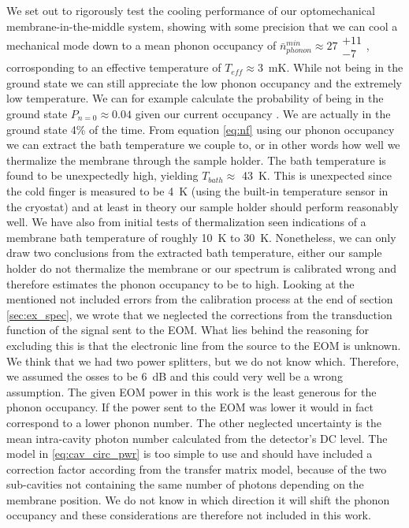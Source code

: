 We set out to rigorously test the cooling performance of our optomechanical membrane-in-the-middle system, showing with some precision that we can cool a mechanical mode down to a mean phonon occupancy of $\bar{n}_{phonon}^{min} \approx 27\substack{+11 \\ -7}$, corrosponding to an effective temperature of $T_{eff} \approx$\SI{3}{\milli\kelvin}. While not being in the ground state we can still appreciate the low phonon occupancy and the extremely low temperature. We can for example calculate the probability of being in the ground state $P_{n = 0} \approx 0.04$ given our current occupancy \cite{gerry2005}. We are actually in the ground state 4\% of the time. From equation \eqref{eq:nf} using our phonon occupancy we can extract the bath temperature we couple to, or in other words how well we thermalize the membrane through the sample holder. The bath temperature is found to be unexpectedly high, yielding $T_{bath} \approx$ \SI{43}{\kelvin}. This is unexpected since the cold finger is measured to be \SI{4}{\kelvin} (using the built-in temperature sensor in the cryostat) and at least in theory our sample holder should perform reasonably well. We have also from initial tests of thermalization seen indications of a membrane bath temperature of roughly \SI{10}{\kelvin} to \SI{30}{\kelvin}. Nonetheless, we can only draw two conclusions from the extracted bath temperature, either our sample holder do not thermalize the membrane or our spectrum is calibrated wrong and therefore estimates the phonon occupancy to be to high. Looking at the mentioned not included errors from the calibration process at the end of section \ref{sec:ex_spec}, we wrote that we neglected the corrections from the transduction function of the signal sent to the EOM. What lies behind the reasoning for excluding this is that the electronic line from the source to the EOM is unknown. We think that we had two power splitters, but we do not know which. Therefore, we assumed the osses to be \SI{6}{dB} and this could very well be a wrong assumption. The given EOM power in this work is the least generous for the phonon occupancy. If the power sent to the EOM was lower it would in fact correspond to a lower phonon number. The other neglected uncertainty is the mean intra-cavity photon number calculated from the detector's DC level. The model in \eqref{eq:cav_circ_pwr} is too simple to use and should have included a correction factor according from the transfer matrix model, because of the two sub-cavities not containing the same number of photons depending on the membrane position. We do not know in which direction it will shift the phonon occupancy and these considerations are therefore not included in this work.


